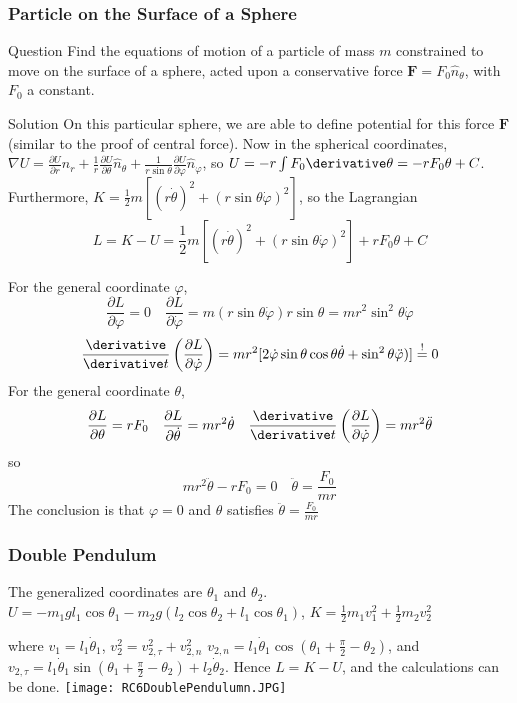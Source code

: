 \begin{frame}
\frametitle{Particle on the Surface of a Sphere}
\begin{block}{Question}
Find the equations of motion of a particle of mass $m$ constrained to move on the surface of a sphere, acted upon a conservative force $\mathbf{F}=F_0\hat n_\theta$, with $F_0$ a constant.
\end{block}
\begin{block}{Solution}
On this particular sphere, we are able to define potential for this force $\mathbf{F}$ (similar to the proof of central force). Now in the spherical coordinates, $\nabla U=\frac{\partial U}{\partial r}\hat n_r+\frac{1}{r}\frac{\partial U}{\partial \theta}\hat n_\theta+\frac{1}{r\sin\theta}\frac{\partial U}{\partial\varphi}\hat n_\varphi$, so $U=-r\int F_0\derivative\theta=-rF_0\theta+C$. Furthermore, $K=\frac{1}{2}m[(r\dot\theta)^2+(r\sin\theta\dot\varphi)^2]$, so the Lagrangian \[L=K-U=\frac{1}{2}m[(r\dot\theta)^2+(r\sin\theta\dot\varphi)^2]+rF_0\theta+C\]
\end{block}
\end{frame}
\begin{frame}
For the general coordinate $\varphi$,
\[\frac{\partial L}{\partial\varphi}=0\quad\frac{\partial L}{\partial\dot\varphi}=m(r\sin\theta\dot\varphi)r\sin\theta=mr^2\sin^2\theta\dot\varphi\]\[\frac{\derivative}{\derivative t}\left(\frac{\partial L}{\partial\dot\varphi}\right)=mr^2[2\dot\varphi\sin\theta\cos\theta\dot\theta+\sin^2\theta\ddot\varphi)]\overset{!}{=}0\]
For the general coordinate $\theta$,
\[\frac{\partial L}{\partial\theta}=rF_0\quad\frac{\partial L}{\partial\dot\theta}=mr^2\dot\theta\quad \frac{\derivative}{\derivative t}\left(\frac{\partial L}{\partial\dot\varphi}\right)=mr^2\ddot\theta\]so \[mr^2\ddot\theta-rF_0=0\quad\ddot\theta=\frac{F_0}{mr}\]
The conclusion is that $\varphi=0$ and $\theta$ satisfies $\ddot\theta=\frac{F_0}{mr}$
\end{frame}
\begin{frame}
\frametitle{Double Pendulum}
The generalized coordinates are $\theta_1$ and $\theta_2$. $U=-m_1gl_1\cos\theta_1-m_2g(l_2\cos\theta_2+l_1\cos\theta_1)$, $K=\frac{1}{2}m_1v_1^2+\frac{1}{2}m_2 v_2^2$
\begin{multicols}{2} where $v_1=l_1\dot\theta_1$, $v_2^2=v_{2,\tau}^2+v_{2,n}^2$ $v_{2,n}=l_1\dot\theta_1\cos(\theta_1+\frac{\pi}{2}-\theta_2)$, and $v_{2,\tau}=l_1\dot\theta_1\sin(\theta_1+\frac{\pi}{2}-\theta_2)+l_2\dot\theta_2$.
Hence $L=K-U$, and the calculations can be done.
\texttt{[image: RC6DoublePendulumn.JPG]}
\end{multicols}
\end{frame}
